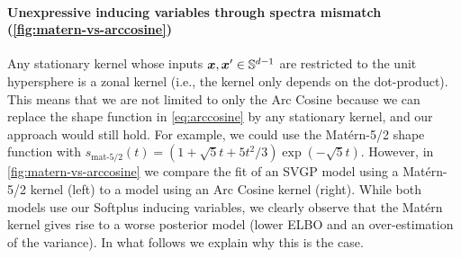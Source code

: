 \paragraph{Unexpressive inducing variables through spectra mismatch (\cref{fig:matern-vs-arccosine})} Any stationary kernel whose inputs $\bm{x},\bm{x}' \in \mathbb{S}^{d-1}$ are restricted to the unit hypersphere is a zonal kernel (i.e., the kernel only depends on the dot-product). This means that we are not limited to only the Arc Cosine because we can replace the shape function in \cref{eq:arccosine} by any stationary kernel, and our approach would still hold. For example, we could use the Mat\'ern-5/2 shape function with $s_{\text{mat-5/2}}(t) = \left(1+{{{\sqrt {5}} t}}+{{5 t^{2}}/{3}}\right)\exp \left(-{{{\sqrt {5}} t}}\right)$. However, in \cref{fig:matern-vs-arccosine} we compare the fit of an SVGP model using a Mat\'ern-5/2 kernel (left) to a model using an Arc Cosine kernel (right). While both models use our Softplus inducing variables, we clearly observe that the Mat\'ern kernel gives rise to a worse posterior model (lower ELBO and an over-estimation of the variance). In what follows we explain why this is the case.





